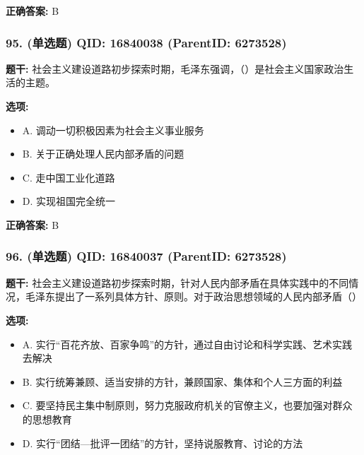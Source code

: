 \documentclass[12pt,UTF8]{ctexart}
\begin{document}
\textbf{正确答案:}
B

\vspace{0.3em}\hrulefill\vspace{0.7em}

\subsubsection*{95. (单选题) \small QID: 16840038 (ParentID: 6273528)}

\textbf{题干:}
社会主义建设道路初步探索时期，毛泽东强调，（）是社会主义国家政治生活的主题。



\textbf{选项:}
\begin{itemize}[leftmargin=*]

  \item A. 调动一切积极因素为社会主义事业服务

  \item B. 关于正确处理人民内部矛盾的问题

  \item C. 走中国工业化道路

  \item D. 实现祖国完全统一

\end{itemize}

\textbf{正确答案:}
B

\vspace{0.3em}\hrulefill\vspace{0.7em}

\subsubsection*{96. (单选题) \small QID: 16840037 (ParentID: 6273528)}

\textbf{题干:}
社会主义建设道路初步探索时期，针对人民内部矛盾在具体实践中的不同情况，毛泽东提出了一系列具体方针、原则。对于政治思想领域的人民内部矛盾（）



\textbf{选项:}
\begin{itemize}[leftmargin=*]

  \item A. 实行“百花齐放、百家争鸣”的方针，通过自由讨论和科学实践、艺术实践去解决

  \item B. 实行统筹兼顾、适当安排的方针，兼顾国家、集体和个人三方面的利益

  \item C. 要坚持民主集中制原则，努力克服政府机关的官僚主义，也要加强对群众的思想教育

  \item D. 实行“团结—批评一团结”的方针，坚持说服教育、讨论的方法

\end{itemize}
\end{document}
